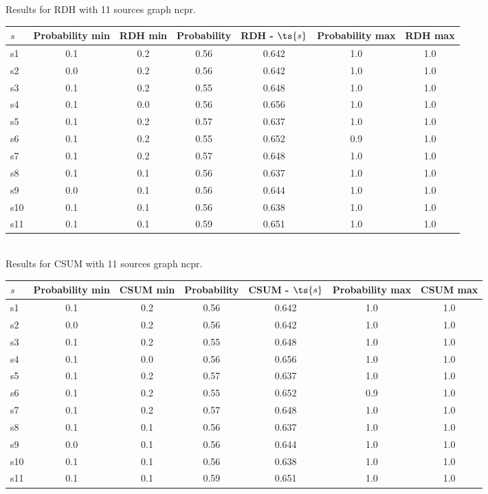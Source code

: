\documentclass{article}
\begin{document}
\noindent Results for RDH with 11 sources graph ncpr.

\noindent\begin{tabular}{|l|c|c|c|c|c|c|}
\hline
$s$& Probability min & RDH min & Probability & RDH - $\ts{s}$ & Probability max & RDH max\\
\hline
s1 &0.1 & 0.2 & 0.56 & 0.642 & 1.0 & 1.0\\
\hline
s2 &0.0 & 0.2 & 0.56 & 0.642 & 1.0 & 1.0\\
\hline
s3 &0.1 & 0.2 & 0.55 & 0.648 & 1.0 & 1.0\\
\hline
s4 &0.1 & 0.0 & 0.56 & 0.656 & 1.0 & 1.0\\
\hline
s5 &0.1 & 0.2 & 0.57 & 0.637 & 1.0 & 1.0\\
\hline
s6 &0.1 & 0.2 & 0.55 & 0.652 & 0.9 & 1.0\\
\hline
s7 &0.1 & 0.2 & 0.57 & 0.648 & 1.0 & 1.0\\
\hline
s8 &0.1 & 0.1 & 0.56 & 0.637 & 1.0 & 1.0\\
\hline
s9 &0.0 & 0.1 & 0.56 & 0.644 & 1.0 & 1.0\\
\hline
s10 &0.1 & 0.1 & 0.56 & 0.638 & 1.0 & 1.0\\
\hline
s11 &0.1 & 0.1 & 0.59 & 0.651 & 1.0 & 1.0\\
\hline
\end{tabular}\\

\noindent Results for CSUM with 11 sources graph ncpr.

\noindent\begin{tabular}{|l|c|c|c|c|c|c|}
\hline
$s$& Probability min & CSUM min & Probability & CSUM - $\ts{s}$ & Probability max & CSUM max\\
\hline
s1 &0.1 & 0.2 & 0.56 & 0.642 & 1.0 & 1.0\\
\hline
s2 &0.0 & 0.2 & 0.56 & 0.642 & 1.0 & 1.0\\
\hline
s3 &0.1 & 0.2 & 0.55 & 0.648 & 1.0 & 1.0\\
\hline
s4 &0.1 & 0.0 & 0.56 & 0.656 & 1.0 & 1.0\\
\hline
s5 &0.1 & 0.2 & 0.57 & 0.637 & 1.0 & 1.0\\
\hline
s6 &0.1 & 0.2 & 0.55 & 0.652 & 0.9 & 1.0\\
\hline
s7 &0.1 & 0.2 & 0.57 & 0.648 & 1.0 & 1.0\\
\hline
s8 &0.1 & 0.1 & 0.56 & 0.637 & 1.0 & 1.0\\
\hline
s9 &0.0 & 0.1 & 0.56 & 0.644 & 1.0 & 1.0\\
\hline
s10 &0.1 & 0.1 & 0.56 & 0.638 & 1.0 & 1.0\\
\hline
s11 &0.1 & 0.1 & 0.59 & 0.651 & 1.0 & 1.0\\
\hline
\end{tabular}\\
\end{document}
